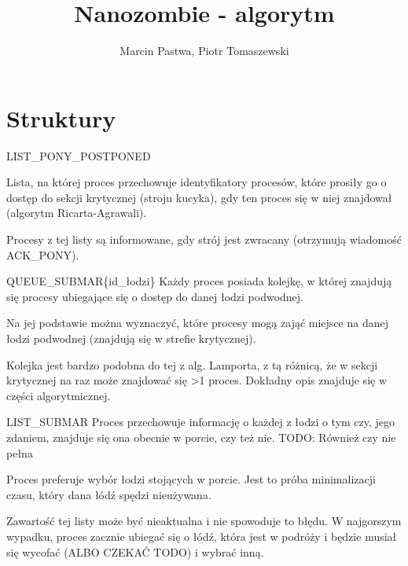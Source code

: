 \documentclass{beamer}
\title[Nanozombie]{Nanozombie - algorytm}
\author{Marcin Pastwa, Piotr Tomaszewski}
\date{}
\begin{document}
\begin{frame}
  \titlepage
\end{frame}


\section{Struktury}

\begin{frame}{LIST\_PONY\_POSTPONED}
\internallinenumbers
    \resetlinenumber[1]

    Lista, na której proces przechowuje identyfikatory procesów, które prosiły go o dostęp do sekcji krytycznej (stroju kucyka), gdy ten proces się w niej znajdował (algorytm Ricarta-Agrawali).

    \vspace{1cm}
    Procesy z tej listy są informowane, gdy strój jest zwracany  (otrzymują wiadomość ACK\_PONY).
\end{frame}

\begin{frame}{QUEUE\_SUBMAR\{id\_łodzi\}}
    \internallinenumbers
    \resetlinenumber[1]
    Każdy proces posiada kolejkę, w której znajdują się procesy ubiegające się o dostęp do danej łodzi podwodnej.
    
    \vspace{1cm}
    Na jej podstawie można wyznaczyć, które procesy mogą zająć miejsce na danej łodzi podwodnej (znajdują się w strefie krytycznej).

    \vspace{1cm}
    Kolejka jest bardzo podobna do tej z alg. Lamporta, z tą różnicą, że w sekcji krytycznej na raz może znajdować się >1 proces. Dokładny opis znajduje się w części algorytmicznej.
\end{frame}

\begin{frame}{LIST\_SUBMAR}
    \internallinenumbers
    \resetlinenumber[1]
    Proces przechowuje informację o każdej z łodzi o tym czy, jego zdaniem, znajduje się ona obecnie w porcie, czy też nie.
    TODO: Również czy nie pełna
    
    \vspace{1cm}
    Proces preferuje wybór łodzi stojących w porcie. Jest to próba minimalizacji czasu, który dana łódź spędzi nieużywana.

    \vspace{1cm}
    Zawartość tej listy może być nieaktualna i nie spowoduje to błędu. W najgorszym wypadku, proces zacznie ubiegać się o łódź, która jest w podróży i będzie musiał się wycofać (ALBO CZEKAĆ TODO) i wybrać inną.
\end{frame}
\end{document}
